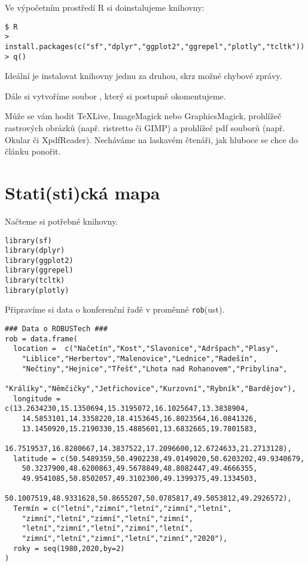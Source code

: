 Ve výpočetním prostředí R si doinstalujeme knihovny:
\begin{lstlisting}
$ R
> install.packages(c("sf","dplyr","ggplot2","ggrepel","plotly","tcltk"))
> q()
\end{lstlisting}
Ideální je instalovat knihovny jednu za druhou, skrz možné chybové zprávy.

Dále si vytvoříme soubor , který si postupně okomentujeme.
\lstset{numbersep=5pt, numbers=left, firstnumber=last}
\addtocounter{lstnumber}{-3}

\newpage
Může se vám hodit \TeX Live, ImageMagick nebo GraphicsMagick, prohlížeč rastrových obrázků (např. ristretto či GIMP) a prohlížeč pdf souborů (např. Okular či XpdfReader). Necháváme na laskavém čtenáři, jak hluboce se chce do článku ponořit.



\section{Stati(sti)cká mapa}

Načteme si potřebné knihovny.

\begin{lstlisting}
library(sf)
library(dplyr)
library(ggplot2)
library(ggrepel)
library(tcltk)
library(plotly)
\end{lstlisting}

Připravíme si data o konferenční řadě v proměnné \texttt{rob}(ust).

\begin{lstlisting}
### Data o ROBUSTech ###
rob = data.frame(
  location =  c("Načetín","Kost","Slavonice","Adršpach","Plasy",
    "Liblice","Herbertov","Malenovice","Lednice","Radešín",
    "Nečtiny","Hejnice","Třešť","Lhota nad Rohanovem","Pribylina",
    "Králíky","Němčičky","Jetřichovice","Kurzovní","Rybník","Bardějov"),
  longitude = c(13.2634230,15.1350694,15.3195072,16.1025647,13.3838904,  
    14.5853101,14.3358220,18.4153645,16.8023564,16.0841326,
    13.1450920,15.2190330,15.4885601,13.6832665,19.7801583,
    16.7519537,16.8280667,14.3837522,17.2096600,12.6724633,21.2713128),
  latitude = c(50.5489359,50.4902238,49.0149020,50.6203202,49.9340679,  
    50.3237900,48.6200863,49.5678849,48.8082447,49.4666355,
    49.9541085,50.8502057,49.3102300,49.1399375,49.1334503,
    50.1007519,48.9331628,50.8655207,50.0785817,49.5053812,49.2926572),
  Termín = c("letní","zimní","letní","zimní","letní",
    "zimní","letní","zimní","letní","zimní",
    "letní","zimní","letní","zimní","letní",
    "zimní","letní","zimní","letní","zimní","2020"),
  roky = seq(1980,2020,by=2)
)
\end{lstlisting}

